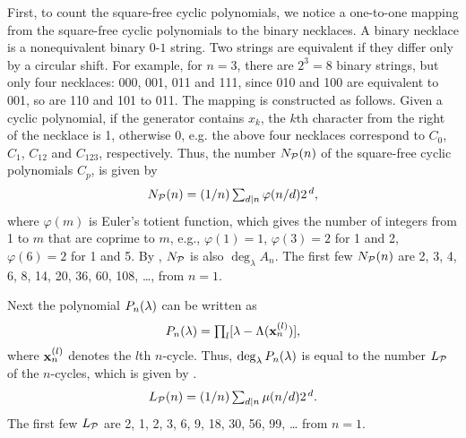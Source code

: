 \documentclass{ws-ijbc}
\begin{document}
First, to count the square-free cyclic polynomials,
  we notice a one-to-one mapping
  from the square-free cyclic polynomials
  to the binary necklaces.
%
A binary necklace
  is a nonequivalent binary $0$-$1$ string.
%
Two strings are equivalent if they differ only by a circular shift.
%
For example, for $n = 3$, there are $2^3 = 8$ binary strings,
but only four necklaces: 000, 001, 011 and 111,
since 010 and 100 are equivalent to 001,
so are 110 and 101 to 011.
%
The mapping is constructed as follows.
%
Given a cyclic polynomial, if the generator contains $x_k$,
  the $k$th character from the right of the necklace is 1,
  otherwise 0,
e.g. the above four necklaces correspond to
  $C_0$, $C_1$, $C_{12}$ and $C_{123}$, respectively.
Thus,
%
the number $N_\mathcal P(n)$ of the square-free cyclic polynomials $C_p$,
  is given by
\begin{equation}
  N_\mathcal P(n) = (1/n) \textstyle\sum_{d|n} \varphi(n/d) 2^{\,d},
\label{eq:necklace}
\end{equation}
%
%
where $\varphi(m)$ is Euler's totient function,
which gives the number of integers from 1 to $m$
  that are coprime to $m$,
  e.g.,
  $\varphi(1) = 1$,
  $\varphi(3) = 2$ for 1 and 2,
  $\varphi(6) = 2$ for 1 and 5.
By ,
  $N_\mathcal P$ is also $\deg_\lambda A_n$.
The first few $N_\mathcal P(n)$ are
2, 3, 4, 6, 8, 14, 20, 36, 60, 108, \dots, %
  from $n = 1$.





Next the polynomial $P_n(\lambda)$ can be written as
\begin{equation}
  P_n(\lambda) = \textstyle\prod_l [\lambda - \Lambda(\mathbf{x}_{n}^{(l)})],
\end{equation}
where $\mathbf{x}_{n}^{(l)}$ denotes the $l$th $n$-cycle.
%
Thus, $\deg_\lambda P_n(\lambda)$
  is equal to the number $L_\mathcal P$ of the $n$-cycles,
  which is given by
  \cite{hao, hao2, lutzky}.
\begin{equation}
  L_\mathcal P(n) = (1/n)\textstyle\sum_{d | n} \mu(n/d) 2^{\,d}.
\label{eq:lyndon}
\end{equation}
%
%
%
The first few $L_\mathcal P$ are
2, 1, 2, 3, 6, 9, 18, 30, 56, 99, \dots %
from $n = 1$.
\end{document}
